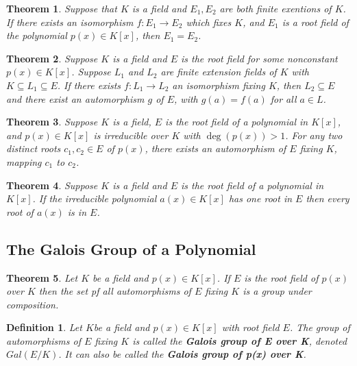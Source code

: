\documentclass[letterpaper, 12pt]{article}
\newtheorem{defn}{Definition}
\newtheorem{thm}{Theorem}
\begin{document}
			\setcounter{thm}{11}
			\begin{thm}
			Suppose that $K$ is a field and $E_{1}, E_{2}$ are both finite exentions of $K$.
			If there exists an isomorphism $f : E_{1} \to E_{2}$ which fixes $K$, and $E_{1}$ is a root field of the polynomial $p(x) \in K[x]$, then $E_{1} = E_{2}$.
			\end{thm}

			\begin{thm}
			Suppose $K$ is a field and $E$ is the root field for some nonconstant $p(x) \in K[x]$.
			Suppose $L_{1}$ and $L_{2}$ are finite extension fields of $K$ with $K \subseteq L_{1} \subseteq E$.
			If there exists $f : L_{1} \to L_{2}$ an isomorphism fixing $K$, then $L_{2} \subseteq E$ and there exist an automorphism $g$ of $E$, with $g(a) = f(a)$ for all $a \in L$.
			\end{thm}

			\begin{thm}
			Suppose $K$ is a field, $E$ is the root field of a polynomial in $K[x]$, and $p(x) \in K[x]$ is irreducible over $K$ with $\deg(p(x)) > 1$.
			For any two distinct roots $c_{1},c_{2} \in E$ of $p(x)$, there exists an automorphism of $E$ fixing $K$, mapping $c_{1}$ to $c_{2}$.
			\end{thm}

			\setcounter{thm}{15}
			\begin{thm}
			Suppose $K$ is a field and $E$ is the root field of a polynomial in $K[x]$.
			If the irreducible polynomial $a(x) \in K[x]$ has one root in $E$ then every root of $a(x)$ is in $E$.
			\end{thm}

		\subsection{The Galois Group of a Polynomial}
		\label{sec:the_galois_group_of_a_polynomial}
			\setcounter{thm}{17}
			\begin{thm}
			Let $K$ be a field and $p(x) \in K[x]$.
			If $E$ is the root field of $p(x)$ over $K$ then the set pf all automorphisms of $E$ fixing $K$ is a group under composition.
			\end{thm}

			\setcounter{defn}{18}
			\begin{defn}
			Let $K$be a field and $p(x) \in K[x]$ with root field $E$.
			The group of automorphisms of $E$ fixing $K$ is called the \textbf{Galois group of E over K}, denoted $Gal(E/K)$.
			It can also be called the \textbf{Galois group of p(x) over K}.
			\end{defn}
\end{document}
